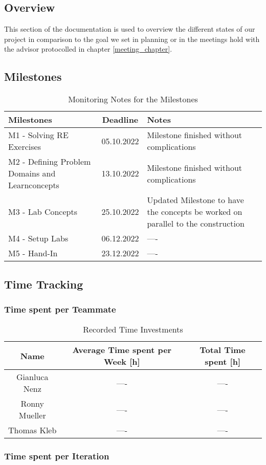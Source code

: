 \subsection{Overview}
This section of the documentation is used to overview the different states of our project in comparison to the goal we set in planning or in the meetings hold with the advisor protocolled in chapter \ref*{meeting_chapter}.

\subsection{Milestones}

\begin{table}[H]
    \centering
    \begin{tabular}[]{|| p{5cm} | c | p{6.2cm} ||}
        \hline
        Milestones & Deadline & Notes \\
        \hline \hline
        M1 - Solving RE Exercises & 05.10.2022 & Milestone finished without complications \\
        \hline
        M2 - Defining Problem Domains and Learnconcepts& 13.10.2022 & Milestone finished without complications \\
        \hline
        M3 - Lab Concepts & 25.10.2022 & Updated Milestone to have the concepts be worked on parallel to the construction \\
        \hline
        M4 - Setup Labs & 06.12.2022 & ---- \\
        \hline
        M5 - Hand-In & 23.12.2022 & ---- \\
        \hline
    \end{tabular}
    \caption{Monitoring Notes for the Milestones}
    \label{milestones_monitoring_table}
\end{table}

\subsection{Time Tracking}

\subsubsection*{Time spent per Teammate}
\begin{table}[H]
    \centering
    \begin{tabular}{||c c c||} 
        \hline
        Name & Average Time spent per Week [h] & Total Time spent [h]\\ [0.5ex] 
        \hline\hline
        Gianluca Nenz &  ---- & ---- \\ 
        \hline
        Ronny Mueller &  ---- & ---- \\
        \hline
        Thomas Kleb & ---- & ---- \\ 
        \hline
    \end{tabular}
    \caption{Recorded Time Investments}
    \label{time_ects_recorded}
\end{table}

\subsubsection*{Time spent per Iteration}
